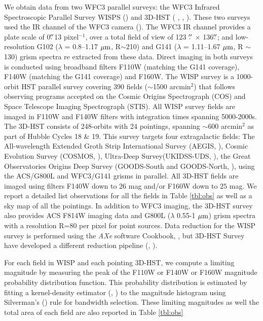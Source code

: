 \documentclass[manuscript]{aastex}
\begin{document}
We obtain data from two WFC3 parallel surveys: the WFC3 Infrared Spectroscopic Parallel Survey WISPS (\citealt{2010ApJ...723..104A}) and 3D-HST ( \citealt{Momcheva2016}, \citealt{2012ApJS..200...13B}, \citealt{Skelton2014}). These two surveys used the IR channel of the WFC3 camera (\citealt{doi:10.1117/12.789581}). The WFC3 IR channel provides a plate scale of 0$\mbox{$.\!\!^{\prime\prime}$}$13 pixel$^{-1}$, over a total field of view of 123 $\mbox{$.\!\!^{\prime\prime}$}$ $\times$ 136$\mbox{$.\!\!^{\prime\prime}$}$; and low-resolution G102 ($\lambda$ = 0.8--1.17 $\mbox{$\mu$m}$, R$\sim$210) and G141  ($\lambda$ = 1.11--1.67  $\mbox{$\mu$m}$, R $\sim$130) grism spectra re extracted from these data. Direct imaging in both surveys is conducted using broadband filters F110W (matching the G141 coverage), F140W (matching the G141 coverage) and F160W. 
The WISP survey is a 1000-orbit HST parallel survey covering 390 fields ($\sim$1500 arcmin$^2$) that follows observing programs accepted on the Cosmic Origins Spectrograph (COS) and Space Telescope Imaging Spectrograph (STIS). All WISP survey fields are imaged in F110W and F140W filters with integration times spanning 5000-2000s. The 3D-HST consists of  248-orbits with 24 pointings, spanning $\sim$600 arcmin$^2$ as part of Hubble Cycles 18 \& 19. This survey targets four extragalactic fields: The All-wavelength Extended Groth Strip International Survey (AEGIS, \citealt{1538-4357-660-1-L1} ), Cosmic Evolution Survey (COSMOS, ), Ultra-Deep Survey(UKIDSS-UDS, \citealt{2007MNRAS.379.1599L}), the Great Observatories Origins Deep Survey (GOODS-South and GOODS-North, \citealt{Giavalisco2004}), using the ACS/G800L and WFC3/G141 grisms in parallel. All 3D-HST fields are imaged using filters F140W down to $26$ mag  and/or F160W down to $25$ mag. We report a detailed list observations for all the fields in Table \ref{tbl:obs} as well as a sky map of all the pointings. In addition to WFC3 imaging, the 3D-HST survey also provides ACS F814W imaging data and G800L ($\lambda$ 0.55-1 $\mbox{$\mu$m}$) grism spectra with a resolution R=80 per pixel for point sources. Data reduction for the WISP survey is performed using the \textit{AXe} software Cookbook, \citealt{Kuntschner2013}, \citealt{Kummel2009} but 3D-HST Survey have developed a different reduction pipeline (\citealt{Momcheva2016}, \citealt{Brammer2012}).

For each field in WISP and each pointing 3D-HST,  we compute a limiting magnitude by measuring the peak of the F110W or F140W or F160W magnitude probability distribution function. This probability distribution is estimated by fitting a kernel-density estimator (\citealt{parzen1962}, \citealt{rosenblatt1956}) to the magnitude histogram using Silverman's (\citealt{silverman1986}) rule for bandwidth selection. These limiting magnitudes as well the total area of each field are also reported in Table \ref{tbl:obs}
\end{document}
